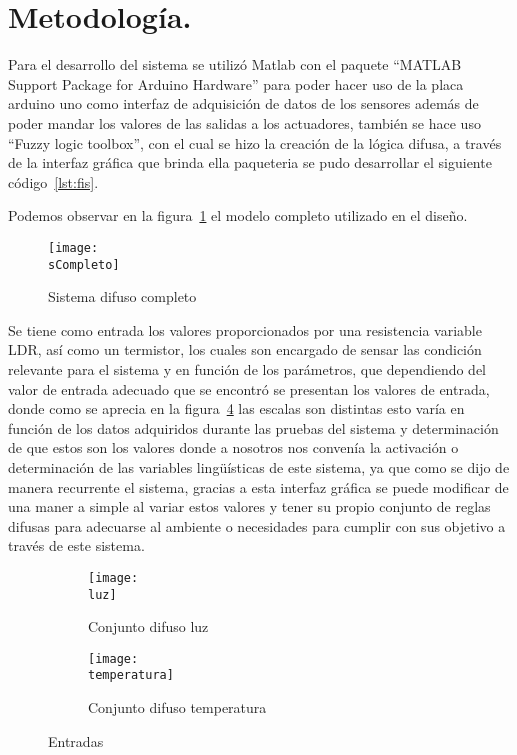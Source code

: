 \documentclass[a4paper, 12pt]{article}
\newcommand{\sCompleto}{img/completo.png}
\newcommand{\luz}{img/luz.png}
\newcommand{\temperatura}{img/temp.png}
\newcommand{\codeB}{code/fuzzy.fis}
\begin{document}
    
    \section{Metodología.}
    Para el desarrollo del sistema se utilizó Matlab con el paquete “MATLAB Support Package for Arduino Hardware”  para poder hacer uso de la placa arduino uno como interfaz de adquisición de datos de los sensores además de poder mandar los valores de las salidas a los actuadores, también se hace uso “Fuzzy logic toolbox”, con el cual se hizo la creación de la lógica difusa, a través de la interfaz gráfica que brinda ella paqueteria se pudo desarrollar el siguiente código~\ref{lst:fis}.
    

    Podemos observar en la figura~\ref{fig:completo} el modelo completo utilizado en el diseño.

    \begin{figure}[H]
        \centering
        \texttt{[image: \\sCompleto]}
        \caption{Sistema difuso completo}
        \label{fig:completo}
    \end{figure}

    Se tiene como entrada los valores proporcionados por una resistencia variable LDR, así como un termistor, los cuales son encargado de sensar las condición relevante para el sistema y en función de los parámetros, que dependiendo del valor de entrada adecuado que se encontró se presentan los valores de entrada, donde como se aprecia en la figura~\ref{fig:nter} las escalas son distintas esto varía en función de los datos adquiridos durante las pruebas del sistema y determinación de que estos son los valores donde a nosotros nos convenía la activación o determinación de las variables lingüísticas de este sistema, ya que como se dijo de manera recurrente el sistema, gracias a esta interfaz gráfica se puede modificar de una maner a simple al variar estos valores y tener su propio conjunto de reglas difusas para adecuarse al ambiente o necesidades para cumplir con sus objetivo a través de este sistema.

    \begin{figure}[H]
        \centering
        \begin{subfigure}{0.8\linewidth}
            \texttt{[image: \\luz]}
            \caption{Conjunto difuso luz}
            \label{sub:luz}
        \end{subfigure}
        \begin{subfigure}{0.8\linewidth}
            \texttt{[image: \\temperatura]}
            \caption{Conjunto difuso temperatura}
            \label{sub:temp}
        \end{subfigure}
        \caption{Entradas}
        \label{fig:nter}
    \end{figure}
\end{document}
